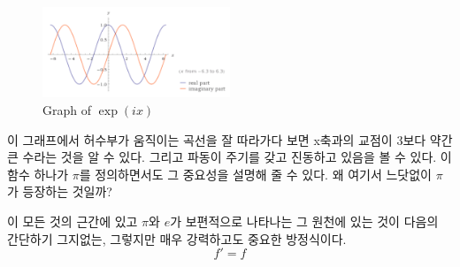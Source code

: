 \documentclass[10pt]{article}
\begin{document}
\begin{figure}
  \centering
  \includegraphics[width = 0.5\textwidth]{exponential.png}
  \caption{Graph of $\exp\left(ix\right)$}
\end{figure}
이 그래프에서 허수부가 움직이는 곡선을 잘 따라가다 보면 x축과의 교점이 3보다 약간 큰 수라는 것을 알 수 있다. 그리고 파동이 주기를 갖고 진동하고 있음을 볼 수 있다. 이 함수 하나가 $\pi$를 정의하면서도 그 중요성을 설명해 줄 수 있다. 왜 여기서 느닷없이 $\pi$가 등장하는 것일까? \par
이 모든 것의 근간에 있고 $\pi$와 $e$가 보편적으로 나타나는 그 원천에 있는 것이 다음의 간단하기 그지없는, 그렇지만 매우 강력하고도 중요한 방정식이다.
$$
  f' = f
$$

\end{document}

